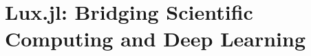 \chapter{Lux.jl: Bridging Scientific Computing and Deep Learning}
\label{chapter:lux_bridging_scientific_computing_and_deep_learning}